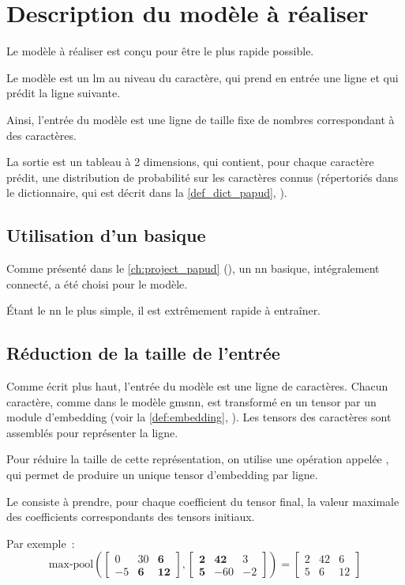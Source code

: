 \chapter{Description du modèle à réaliser}\label{ch:papud_model}
Le modèle à réaliser est conçu pour être le plus rapide possible.

Le modèle est un \gls{lm} au niveau du caractère, qui prend en entrée une ligne et qui prédit la ligne suivante.

Ainsi, l'entrée du modèle est une ligne de taille fixe de nombres correspondant à des caractères.

La sortie est un tableau à 2 dimensions, qui contient, pour chaque caractère prédit, une distribution de probabilité sur les caractères connus (répertoriés dans le dictionnaire, qui est décrit dans la \autoref{def_dict_papud}, ).

\section{Utilisation d'un  basique}
Comme présenté dans le \autoref{ch:project_papud} (), un \gls{nn} basique, intégralement connecté, a été choisi pour le modèle.

Étant le \gls{nn} le plus simple, il est extrêmement rapide à entraîner.

\section{Réduction de la taille de l'entrée}
Comme écrit plus haut, l'entrée du modèle est une ligne de caractères.
Chacun caractère, comme dans le modèle \gls{gmsnn}, est transformé en un \gls{tensor} par un module d'\gls{embedding} (voir la \autoref{def:embedding}, ). Les \glspl{tensor} des caractères sont assemblés pour représenter la ligne.

Pour réduire la taille de cette représentation, on utilise une opération appelée \og {} \fg{}, qui permet de produire un unique \gls{tensor} d'\gls{embedding} par ligne.

Le  consiste à prendre, pour chaque coefficient du \gls{tensor} final, la valeur maximale des coefficients correspondants des \glspl{tensor} initiaux.

Par exemple~:
\[ \text{max-pool}\left(\left[\begin{array}{ccc}0&30&\textbf{6}\\-5&\textbf{6}&\textbf{12}\end{array}\right] , \left[ \begin{array}{ccc}\textbf{2}&\textbf{42}&3\\\textbf{5}&-60&-2\end{array}\right] \right) = \left[\begin{array}{ccc}2&42&6\\5&6&12\end{array}\right]  \]
\vspace{0em}

